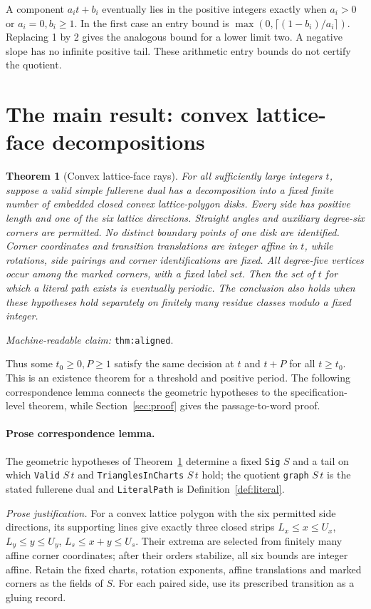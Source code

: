 \documentclass[11pt]{amsart}
\newcommand{\record}[1]{\nolinkurl{#1}}
\newcommand{\claimid}[1]{\par\nopagebreak\noindent\textit{Machine-readable claim:} \record{#1}.\par}
\newtheorem{alignedtheorem}{Theorem}
\theoremstyle{definition}\newtheorem{definition}{Definition}
\begin{document}
A component $a_it+b_i$ eventually lies in the positive integers exactly
when $a_i>0$ or $a_i=0,b_i\ge1$. In the first case an entry bound is
$\max(0,\lceil(1-b_i)/a_i\rceil)$. Replacing 1 by 2 gives the analogous
bound for a lower limit two. A negative slope has no infinite positive
tail. These arithmetic entry bounds do not certify the quotient.

\section{The main result: convex lattice-face decompositions}\label{sec:main}
\begin{alignedtheorem}[Convex lattice-face rays]\label{thm:aligned}
For all sufficiently large integers $t$, suppose a valid simple
fullerene dual has a decomposition into a fixed finite number of
embedded closed convex lattice-polygon disks. Every side has positive
length and one of the six lattice directions. Straight angles and
auxiliary degree-six corners are permitted. No distinct boundary
points of one disk are identified. Corner coordinates and transition
translations are integer affine in $t$, while rotations, side pairings
and corner identifications are fixed. All degree-five vertices occur
among the marked corners, with a fixed label set. Then the set of
$t$ for which a literal path exists is eventually periodic.
The conclusion also holds when these hypotheses hold separately on
finitely many residue classes modulo a fixed integer.
\end{alignedtheorem}
\claimid{thm:aligned}
Thus some $t_0\ge0,P\ge1$ satisfy the same decision at $t$ and $t+P$
for all $t\ge t_0$. This is an existence theorem for a threshold and
positive period. The following correspondence lemma connects the
geometric hypotheses to the specification-level theorem, while
Section~\ref{sec:proof} gives the passage-to-word proof.

\paragraph{Prose correspondence lemma.}
The geometric hypotheses of Theorem~\ref{thm:aligned} determine a fixed
\record{Sig} $S$ and a tail on which
\record{Valid} $S\,t$ and \record{TrianglesInCharts} $S\,t$ hold;
the quotient \record{graph} $S\,t$ is the stated fullerene dual and
\record{LiteralPath} is Definition~\ref{def:literal}.

\emph{Prose justification.}
For a convex lattice polygon with the six permitted side directions,
its supporting lines give exactly three closed strips
$L_x\le x\le U_x$, $L_y\le y\le U_y$,
$L_s\le x+y\le U_s$. Their extrema are selected from finitely many
affine corner coordinates; after their orders stabilize, all six
bounds are integer affine. Retain the fixed charts, rotation exponents,
affine translations and marked corners as the fields of $S$. For each
paired side, use its prescribed transition as a gluing record.
\end{document}
